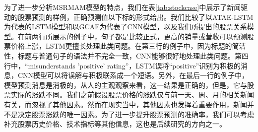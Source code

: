 为了进一步分析MSRMAM模型的特点，我们在表\ref{tab:stockcase}中展示了新闻驱动的股票预测的样例，正确预测值以下标的形式给出。我们比较了以ATAE-LSTM为代表的LSTM模型和以GCAE为代表了CNN模型，以及我们所提出的股票关系模型。在前两行所展示的例子中，句子都是比较正式，更高的销量或营收可以预测股票价格上涨，LSTM更擅长处理此类问题。在第三行的例子中，因为标题的简洁性，标题与普通句子的语法并不完全一致，CNN能够很好地处理此类问题。第四行中，“misunderstands 'positive' rating”，LSTM误将“positive”识别为积极的消息，CNN模型可以将误解与积极联系成一个短语。另外，在最后一行的例子中，模型预测消息是消极的，从人的主观观察来看，这一结果是正确的，但是，它与股票实际的涨跌不同。我们之前假设股票价格的涨跌仅与前一天、周、月的相关新闻有关，而忽视了其他因素。然而在现实当中，其他因素也发挥着重要作用，新闻并不是决定股票涨跌的唯一因素。为了进一步提升股票预测的准确率，我们可以考虑补充股票历史价格、技术指标等其他信息，这也是后续研究的方向之一。


